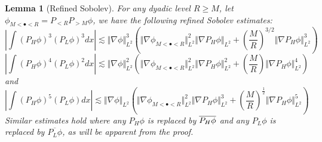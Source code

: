\documentclass[12pt,letterpaper,leqno]{amsart}
\theoremstyle{plain}
\newtheorem{lemma}{Lemma}
\numberwithin{equation}{section}
\numberwithin{theorem}{section}
\numberwithin{proposition}{section}
\numberwithin{lemma}{section}
\numberwithin{corollary}{section}
\begin{document}
\begin{lemma}[Refined Sobolev]
\label{lemma:refined sobolev for continuity}For any dyadic level $R\geq M$,
let $\phi _{M<\bullet <R}=P_{<R}P_{>M}\phi $, we have the following refined
Sobolev estimates: 
\begin{equation}
\left\vert \int \left( P_{H}\phi \right) ^{3}\left( P_{L}\phi \right)
^{3}dx\right\vert \lesssim \Vert \nabla \phi \Vert _{L^{2}}^{3}(\Vert \nabla
\phi _{M<\bullet <R}\Vert _{L^{2}}^{2}\Vert \nabla P_{H}\phi \Vert _{L^{2}}+(%
\frac{M}{R})^{3/2}\Vert \nabla P_{H}\phi \Vert _{L^{2}}^{3})
\label{sobolev:refine1}
\end{equation}%
\begin{equation}
\left\vert \int \left( P_{H}\phi \right) ^{4}\left( P_{L}\phi \right)
^{2}dx\right\vert \lesssim \Vert \nabla \phi \Vert _{L^{2}}^{2}(\Vert \nabla
\phi _{M<\bullet <R}\Vert _{L^{2}}^{2}\Vert \nabla P_{H}\phi \Vert
_{L^{2}}^{2}+\left( \frac{M}{R}\right) \Vert \nabla P_{H}\phi \Vert
_{L^{2}}^{4})  \label{sobolev:refine2}
\end{equation}%
and%
\begin{equation}
\left\vert \int \left( P_{H}\phi \right) ^{5}\left( P_{L}\phi \right)
dx\right\vert \lesssim \Vert \nabla \phi \Vert _{L^{2}}(\Vert \nabla \phi
_{M<\bullet <R}\Vert _{L^{2}}^{2}\Vert \nabla P_{H}\phi \Vert
_{L^{2}}^{3}+\left( \frac{M}{R}\right) ^{\frac{1}{2}}\Vert \nabla P_{H}\phi
\Vert _{L^{2}}^{5})  \label{sobolev:refine3}
\end{equation}%
Similar estimates hold where any $P_{H}\phi $ is replaced by $\overline{%
P_{H}\phi }$ and any $P_{L}\phi $ is replaced by $\overline{P_{L}\phi }$, as
will be apparent from the proof.
\end{lemma}
\end{document}
